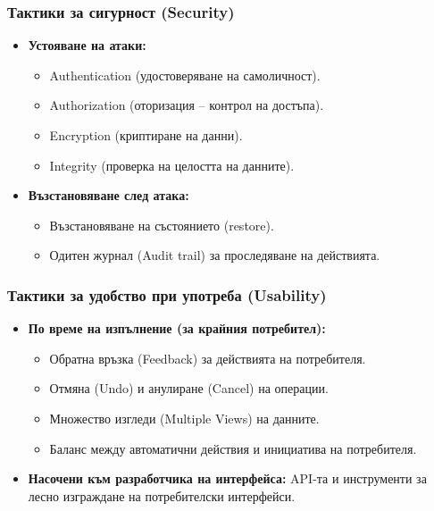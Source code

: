 \documentclass{scrartcl}
\begin{document}
\begin{FlushLeft}
\subsubsection{Тактики за сигурност (Security)}
\begin{itemize}
    \item \textbf{Устояване на атаки:}
    \begin{itemize}
        \item Authentication (удостоверяване на самоличност).
        \item Authorization (оторизация – контрол на достъпа).
        \item Encryption (криптиране на данни).
        \item Integrity (проверка на целостта на данните).
    \end{itemize}
    \item \textbf{Възстановяване след атака:}
    \begin{itemize}
        \item Възстановяване на състоянието (restore).
        \item Одитен журнал (Audit trail) за проследяване на действията.
    \end{itemize}
\end{itemize}

\subsubsection{Тактики за удобство при употреба (Usability)}
\begin{itemize}
    \item \textbf{По време на изпълнение (за крайния потребител):}
    \begin{itemize}
        \item Обратна връзка (Feedback) за действията на потребителя.
        \item Отмяна (Undo) и анулиране (Cancel) на операции.
        \item Множество изгледи (Multiple Views) на данните.
        \item Баланс между автоматични действия и инициатива на потребителя.
    \end{itemize}
    \item \textbf{Насочени към разработчика на интерфейса:} API-та и инструменти за лесно изграждане на потребителски интерфейси.
\end{itemize}


\end{FlushLeft}
\end{document}
